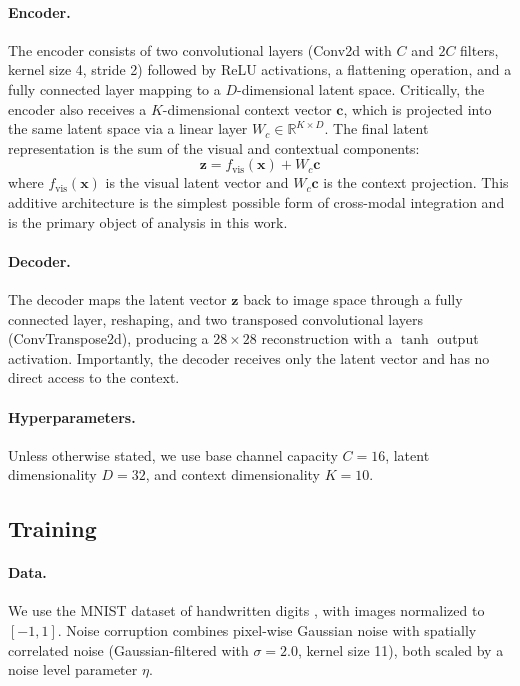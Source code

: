 \documentclass[11pt,a4paper]{article}
\begin{document}
\paragraph{Encoder.}
The encoder consists of two convolutional layers (Conv2d with $C$ and $2C$ filters, kernel size 4, stride 2) followed by ReLU activations, a flattening operation, and a fully connected layer mapping to a $D$-dimensional latent space.
Critically, the encoder also receives a $K$-dimensional context vector $\mathbf{c}$, which is projected into the same latent space via a linear layer $W_c \in \mathbb{R}^{K \times D}$.
The final latent representation is the sum of the visual and contextual components:
\begin{equation}
    \mathbf{z} = f_\text{vis}(\mathbf{x}) + W_c \mathbf{c}
    \label{eq:latent}
\end{equation}
where $f_\text{vis}(\mathbf{x})$ is the visual latent vector and $W_c \mathbf{c}$ is the context projection.
This additive architecture is the simplest possible form of cross-modal integration and is the primary object of analysis in this work.

\paragraph{Decoder.}
The decoder maps the latent vector $\mathbf{z}$ back to image space through a fully connected layer, reshaping, and two transposed convolutional layers (ConvTranspose2d), producing a $28 \times 28$ reconstruction with a $\tanh$ output activation.
Importantly, the decoder receives only the latent vector and has no direct access to the context.

\paragraph{Hyperparameters.}
Unless otherwise stated, we use base channel capacity $C = 16$, latent dimensionality $D = 32$, and context dimensionality $K = 10$.

\subsection{Training}

\paragraph{Data.}
We use the MNIST dataset of handwritten digits \citep{lecun1998gradient}, with images normalized to $[-1, 1]$.
Noise corruption combines pixel-wise Gaussian noise with spatially correlated noise (Gaussian-filtered with $\sigma = 2.0$, kernel size 11), both scaled by a noise level parameter $\eta$.
\end{document}
